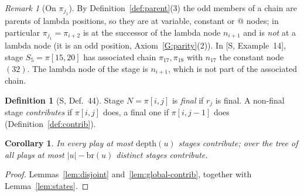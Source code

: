 \documentclass[11pt]{article}
\newcommand{\depth}{\mathrm{depth}}
\newcommand{\br}{\mathrm{br}}
\newcommand{\iv}[2]{\pi[#1,#2]}
\theoremstyle{plain}
\newtheorem{corollary}[theorem]{Corollary}
\theoremstyle{definition}
\newtheorem{definition}[theorem]{Definition}
\theoremstyle{remark}
\newtheorem{remark}[theorem]{Remark}
\begin{document}
\begin{remark}[On $\pi_{j_1}$]
By Definition~\ref{def:parent}(3) the odd members of a chain are
parents of lambda positions, so they are at variable, constant or $@$
nodes; in particular $\pi_{j_1}=\pi_{i+2}$ is at the successor of the
lambda node $n_{i+1}$ and is \emph{not} at a lambda node (it is an odd
position, Axiom~\ref{G:parity}(2)).  In [S, Example~14], stage
$S_5=\iv{15}{20}$ has associated chain $\pi_{17},\pi_{18}$ with $n_{17}$
the constant node $(32)$.  The lambda node of the stage is $n_{i+1}$,
which is not part of the associated chain.
\end{remark}

\begin{definition}[S, Def.~44]
Stage $N=\iv ij$ is \emph{final} if $r_j$ is final.  A non-final stage
\emph{contributes} if $\iv ij$ does, a final one if $\iv i{j-1}$ does
(Definition~\ref{def:contrib}).
\end{definition}

\begin{corollary}\label{cor:contrib-stages}
In every play at most $\depth(u)$ stages contribute; over the tree of
all plays at most $|u|-\br(u)$ distinct stages contribute.
\end{corollary}
\begin{proof}
Lemmas~\ref{lem:disjoint} and~\ref{lem:global-contrib}, together with
Lemma~\ref{lem:states}.
\end{proof}
\end{document}
